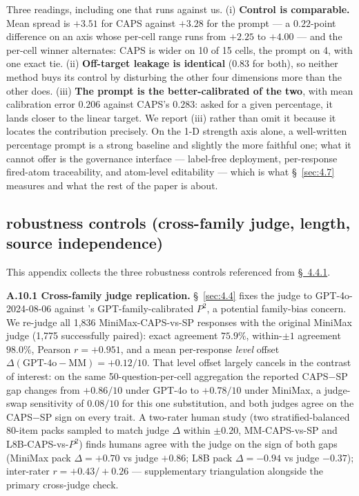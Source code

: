 Three readings, including one that runs against us. (i) \textbf{Control is comparable.} Mean spread is $+3.51$ for CAPS against $+3.28$ for the prompt --- a $0.22$-point difference on an axis whose per-cell range runs from $+2.25$ to $+4.00$ --- and the per-cell winner alternates: CAPS is wider on 10 of 15 cells, the prompt on 4, with one exact tie. (ii) \textbf{Off-target leakage is identical} ($0.83$ for both), so neither method buys its control by disturbing the other four dimensions more than the other does. (iii) \textbf{The prompt is the better-calibrated of the two}, with mean calibration error $0.206$ against CAPS's $0.283$: asked for a given percentage, it lands closer to the linear target. We report (iii) rather than omit it because it locates the contribution precisely. On the 1-D strength axis alone, a well-written percentage prompt is a strong baseline and slightly the more faithful one; what it cannot offer is the governance interface --- label-free deployment, per-response fired-atom traceability, and atom-level editability --- which is what \S~\ref{sec:4.7} measures and what the rest of the paper is about.

\subsection{robustness controls (cross-family judge, length, source independence)}
\label{app:A.10}

This appendix collects the three robustness controls referenced from \hyperref[sec:4.4.1]{\S~4.4.1}.

\label{app:A.10.1}
\textbf{A.10.1 Cross-family judge replication.} \S~\ref{sec:4.4} fixes the judge to GPT-4o-2024-08-06 against \citet{NPTI}'s GPT-family-calibrated $P^{\!2}$, a potential family-bias concern. We re-judge all 1,836 MiniMax-CAPS-vs-SP responses with the original MiniMax judge (1,775 successfully paired): exact agreement $75.9\%$, within-$\pm 1$ agreement $98.0\%$, Pearson $r = +0.951$, and a mean per-response \textit{level} offset $\Delta(\text{GPT-4o} - \text{MM}) = +0.12/10$. That level offset largely cancels in the contrast of interest: on the same 50-question-per-cell aggregation the reported CAPS$-$SP gap changes from $+0.86/10$ under GPT-4o to $+0.78/10$ under MiniMax, a judge-swap sensitivity of $0.08/10$ for this one substitution, and both judges agree on the CAPS$-$SP sign on every trait. A two-rater human study (two stratified-balanced 80-item packs sampled to match judge $\Delta$ within $\pm 0.20$, MM-CAPS-vs-SP and L8B-CAPS-vs-$P^{\!2}$) finds humans agree with the judge on the sign of both gaps (MiniMax pack $\Delta = +0.70$ vs judge $+0.86$; L8B pack $\Delta = -0.94$ vs judge $-0.37$); inter-rater $r = +0.43 / +0.26$ --- supplementary triangulation alongside the primary cross-judge check.

